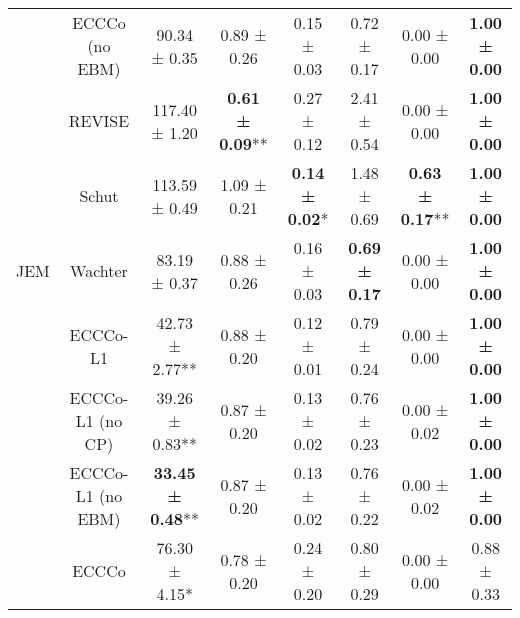 \begin{table}
{\begin{tabular}[t]{cccccccc}
 & ECCCo (no EBM) & 90.34 ± 0.35\hphantom{*}\hphantom{*} & 0.89 ± 0.26\hphantom{*}\hphantom{*} & 0.15 ± 0.03\hphantom{*}\hphantom{*} & 0.72 ± 0.17\hphantom{*}\hphantom{*} & 0.00 ± 0.00\hphantom{*}\hphantom{*} & \textbf{1.00 ± 0.00}\hphantom{*}\hphantom{*}\\

 & REVISE & 117.40 ± 1.20\hphantom{*}\hphantom{*} & \textbf{0.61 ± 0.09}** & 0.27 ± 0.12\hphantom{*}\hphantom{*} & 2.41 ± 0.54\hphantom{*}\hphantom{*} & 0.00 ± 0.00\hphantom{*}\hphantom{*} & \textbf{1.00 ± 0.00}\hphantom{*}\hphantom{*}\\

 & Schut & 113.59 ± 0.49\hphantom{*}\hphantom{*} & 1.09 ± 0.21\hphantom{*}\hphantom{*} & \textbf{0.14 ± 0.02}*\hphantom{*} & 1.48 ± 0.69\hphantom{*}\hphantom{*} & \textbf{0.63 ± 0.17}** & \textbf{1.00 ± 0.00}\hphantom{*}\hphantom{*}\\

\multirow[t]{-10}{*}{\centering\arraybackslash JEM} & Wachter & 83.19 ± 0.37\hphantom{*}\hphantom{*} & 0.88 ± 0.26\hphantom{*}\hphantom{*} & 0.16 ± 0.03\hphantom{*}\hphantom{*} & \textbf{0.69 ± 0.17}\hphantom{*}\hphantom{*} & 0.00 ± 0.00\hphantom{*}\hphantom{*} & \textbf{1.00 ± 0.00}\hphantom{*}\hphantom{*}\\
\cmidrule{1-8}
 & ECCCo-L1 & 42.73 ± 2.77** & 0.88 ± 0.20\hphantom{*}\hphantom{*} & 0.12 ± 0.01\hphantom{*}\hphantom{*} & 0.79 ± 0.24\hphantom{*}\hphantom{*} & 0.00 ± 0.00\hphantom{*}\hphantom{*} & \textbf{1.00 ± 0.00}\hphantom{*}\hphantom{*}\\

 & ECCCo-L1 (no CP) & 39.26 ± 0.83** & 0.87 ± 0.20\hphantom{*}\hphantom{*} & 0.13 ± 0.02\hphantom{*}\hphantom{*} & 0.76 ± 0.23\hphantom{*}\hphantom{*} & 0.00 ± 0.02\hphantom{*}\hphantom{*} & \textbf{1.00 ± 0.00}\hphantom{*}\hphantom{*}\\

 & ECCCo-L1 (no EBM) & \textbf{33.45 ± 0.48}** & 0.87 ± 0.20\hphantom{*}\hphantom{*} & 0.13 ± 0.02\hphantom{*}\hphantom{*} & 0.76 ± 0.22\hphantom{*}\hphantom{*} & 0.00 ± 0.02\hphantom{*}\hphantom{*} & \textbf{1.00 ± 0.00}\hphantom{*}\hphantom{*}\\

 & ECCCo & 76.30 ± 4.15*\hphantom{*} & 0.78 ± 0.20\hphantom{*}\hphantom{*} & 0.24 ± 0.20\hphantom{*}\hphantom{*} & 0.80 ± 0.29\hphantom{*}\hphantom{*} & 0.00 ± 0.00\hphantom{*}\hphantom{*} & 0.88 ± 0.33\hphantom{*}\hphantom{*}\\


\end{tabular}}
\end{table}
